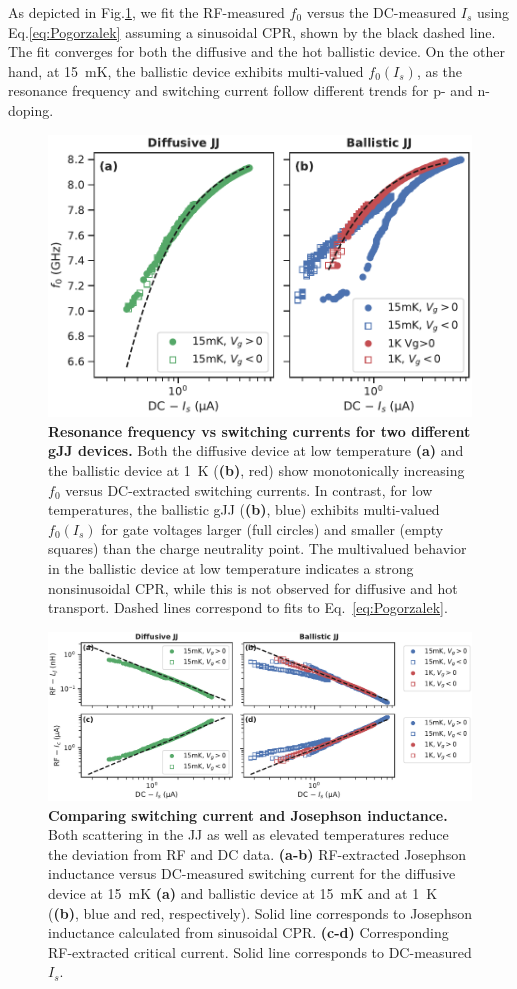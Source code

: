 As depicted in Fig.\ref{fig:figure2}, we fit the RF-measured $f_0$ versus the DC-measured $I_s$ using Eq.\ref{eq:Pogorzalek} assuming a sinusoidal CPR, shown by the black dashed line.
%
The fit converges for both the diffusive and the hot ballistic device.
%
On the other hand, at \SI{15}{\milli\kelvin}, the ballistic device exhibits multi-valued $f_0(I_s)$, as the resonance frequency and switching current follow different trends for p- and n-doping.

\begin{figure}
	\centering
	\includegraphics[width=0.5\linewidth]{chapter-gJJ-CPR/figs/Figure2}
	\caption{
		\textbf{Resonance frequency vs switching currents for two different gJJ devices.}
		Both the diffusive device at low temperature \textbf{(a)} and the ballistic device at \SI{1}{\kelvin} (\textbf{(b)}, red) show monotonically increasing $f_0$ versus DC-extracted switching currents.
		In contrast, for low temperatures, the ballistic gJJ (\textbf{(b)}, blue) exhibits multi-valued $f_0(I_s)$ for gate voltages larger (full circles) and smaller (empty squares) than the charge neutrality point.
		The	multivalued behavior in the ballistic device at low temperature indicates a strong nonsinusoidal CPR, while this is not observed for diffusive and hot transport.
		Dashed lines correspond to fits to Eq.~\ref{eq:Pogorzalek}.
	}
	\label{fig:figure2}
\end{figure}

\begin{figure}
	\centering
	\includegraphics[width=0.833\linewidth]{chapter-gJJ-CPR/figs/Figure3}
	\caption{
		\textbf{Comparing switching current and Josephson inductance.}
		Both scattering in the JJ as well as elevated temperatures reduce the deviation from RF and DC data.
		\textbf{(a-b)} RF-extracted Josephson inductance versus DC-measured switching current for the diffusive device at \SI{15}{\milli\kelvin} \textbf{(a)} and ballistic device at \SI{15}{\milli\kelvin} and at \SI{1}{\kelvin} (\textbf{(b)}, blue and red, respectively).
		Solid line corresponds to Josephson inductance calculated from sinusoidal CPR.
		\textbf{(c-d)} Corresponding RF-extracted critical current.
		Solid line corresponds to DC-measured $I_s$.
	}
	\label{fig:figure3}
\end{figure}

